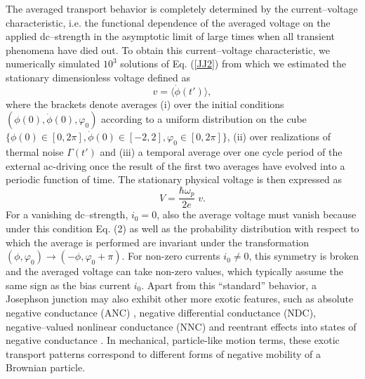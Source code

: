\documentclass[a4,twocolumn,showpacs,showkeys]{revtex4}
\begin{document}
The averaged transport behavior is completely determined by the
current--voltage characteristic, i.e. the functional dependence of the
averaged voltage on the applied dc--strength in the asymptotic limit of
large times when all transient phenomena have died out.   
To obtain this current--voltage characteristic, we numerically simulated $10^3$  solutions of Eq.
(\ref{JJ2}) from which we  estimated   the stationary dimensionless voltage defined as
%
\begin{equation} \label{v}
v=\langle \dot \phi(t') \rangle,
\end{equation}
% 
where the brackets denote averages (i) over the initial conditions $(
\phi(0), \dot\phi(0), \varphi_0)$ according to a uniform distribution
on the cube $\{\phi(0)\in [0,2 \pi], \dot{\phi}(0)\in [-2,2], \varphi_{0}
\in [0,2 \pi] \}$, (ii) over realizations of thermal noise $\Gamma(t')$
and (iii) a temporal average over one cycle
period of the external ac-driving once  the result of the first two
averages  have evolved  into a
periodic function of time. The stationary physical voltage is then expressed as
%
\begin{equation}
\label{V}
V= \frac{\hbar \omega_p}{2e} \; v.
\end{equation}
% 
For a vanishing dc--strength, $i_{0}=0$, also the average voltage must vanish
because under this condition Eq. (2) as well as the probability
distribution with respect to which the average is performed are  
invariant under the transformation 
$(\phi, \varphi_0) \to (-\phi, \varphi_0 + \pi)$. For  non-zero  currents $i_0
\ne 0$, this symmetry is broken and the
averaged voltage can take non-zero values, which typically assume the
same sign as the bias current $i_0$. 
Apart from this ``standard'' behavior, a Josephson junction
may also exhibit other more exotic features, such as absolute negative
conductance (ANC) \cite{machuraPRL,aip}, negative differential
conductance (NDC), negative--valued nonlinear conductance (NNC) and 
reentrant effects into states of negative conductance
\cite{aip,kosturPRB}.  In mechanical, particle-like motion terms,
these exotic transport 
patterns correspond to different forms of negative
mobility of a Brownian particle.
\end{document}
